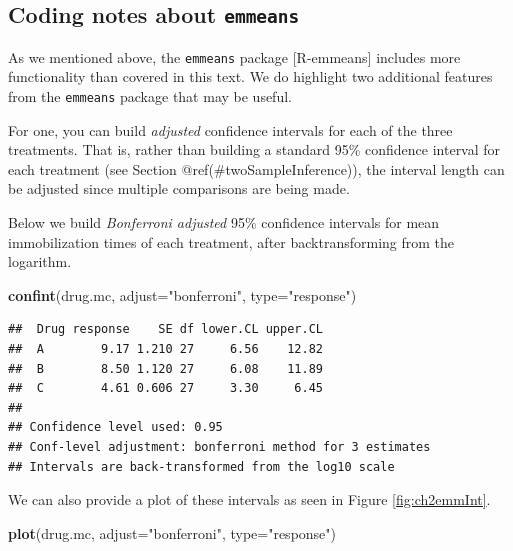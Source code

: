 \documentclass[
]{book}
\newenvironment{Shaded}{\begin{snugshade}}{\end{snugshade}}
\newcommand{\AttributeTok}[1]{\textcolor[rgb]{0.13,0.29,0.53}{#1}}
\newcommand{\FunctionTok}[1]{\textcolor[rgb]{0.13,0.29,0.53}{\textbf{#1}}}
\newcommand{\NormalTok}[1]{#1}
\newcommand{\StringTok}[1]{\textcolor[rgb]{0.31,0.60,0.02}{#1}}
\begin{document}
\hypertarget{coding-notes-about-emmeans}{%
\subsection{\texorpdfstring{Coding notes about \texttt{emmeans}}{Coding notes about emmeans}}\label{coding-notes-about-emmeans}}

As we mentioned above, the \texttt{emmeans} package {[}R-emmeans{]} includes more functionality than covered in this text.
We do highlight two additional features from the \texttt{emmeans} package that may be useful.

For one, you can build \emph{adjusted} confidence intervals for each of the three treatments.
That is, rather than building a standard 95\% confidence interval for each treatment (see Section @ref(\#twoSampleInference)), the interval length can be adjusted since multiple comparisons are being made.

Below we build \emph{Bonferroni adjusted} 95\% confidence intervals for mean immobilization times of each treatment, after backtransforming from the logarithm.

\begin{Shaded}
\begin{Highlighting}[]
\FunctionTok{confint}\NormalTok{(drug.mc, }\AttributeTok{adjust=}\StringTok{"bonferroni"}\NormalTok{, }\AttributeTok{type=}\StringTok{"response"}\NormalTok{)}
\end{Highlighting}
\end{Shaded}

\begin{verbatim}
##  Drug response    SE df lower.CL upper.CL
##  A        9.17 1.210 27     6.56    12.82
##  B        8.50 1.120 27     6.08    11.89
##  C        4.61 0.606 27     3.30     6.45
## 
## Confidence level used: 0.95 
## Conf-level adjustment: bonferroni method for 3 estimates 
## Intervals are back-transformed from the log10 scale
\end{verbatim}

We can also provide a plot of these intervals as seen in Figure \ref{fig:ch2emmInt}.

\begin{Shaded}
\begin{Highlighting}[]
\FunctionTok{plot}\NormalTok{(drug.mc, }\AttributeTok{adjust=}\StringTok{"bonferroni"}\NormalTok{, }\AttributeTok{type=}\StringTok{"response"}\NormalTok{)}
\end{Highlighting}
\end{Shaded}
\end{document}
